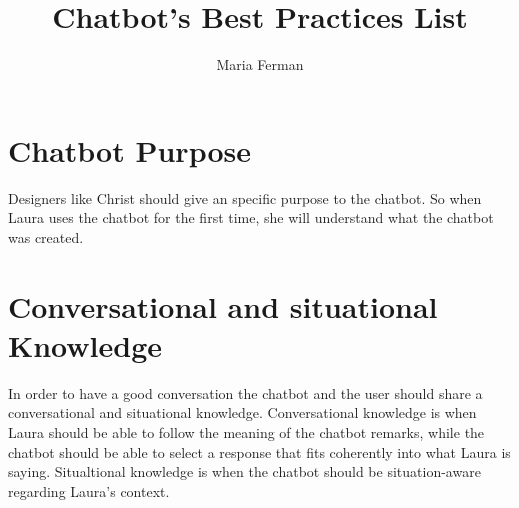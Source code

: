 \documentclass[a4paper,10pt]{article}
\title{Chatbot's Best Practices List}
\author{Maria Ferman}
\begin{document}
\maketitle
\section{Chatbot Purpose}

Designers like Christ should give an specific purpose to the chatbot. So when Laura uses the chatbot for the first time, she will understand what the chatbot was created.

\section{Conversational and situational Knowledge}

In order to have a good conversation the chatbot and the user should share a conversational and situational knowledge.  Conversational knowledge is when Laura should be able to follow the meaning of the chatbot remarks, while the chatbot should be able to select a response that fits coherently into what Laura is saying. Situaltional knowledge is when the chatbot should be situation-aware regarding Laura’s context.



\medskip


\end{document}
